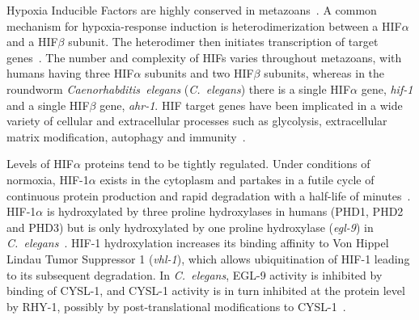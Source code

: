 \documentclass[9pt,twocolumn,twoside]{pnas-new}
\newcommand{\cel}{\emph{C.~elegans}}
\newcommand{\egl}{\emph{egl-9}}
\newcommand{\rhy}{\emph{rhy-1}}
\newcommand{\vhl}{\emph{vhl-1}}
\newcommand{\hif}{\emph{hif-1}}
\newcommand{\eglp}{EGL-9}
\newcommand{\rhyp}{RHY-1}
\newcommand{\vhlp}{VHL-1}
\newcommand{\hifp}{HIF-1}
\begin{document}
Hypoxia Inducible Factors are highly conserved in metazoans~\cite{}. A common mechanism for hypoxia-response induction is heterodimerization between a HIF$\alpha$ and a HIF$\beta$ subunit. The heterodimer then initiates transcription of target genes~\cite{}. The number and complexity of HIFs varies throughout metazoans, with humans having three HIF$\alpha$ subunits and two HIF$\beta$ subunits, whereas in the roundworm \emph{Caenorhabditis~elegans} (\cel{}) there is a single HIF$\alpha$ gene, \hif{} and a single HIF$\beta$ gene, \emph{ahr-1}. HIF target genes have been implicated in a wide variety of cellular and extracellular processes such as glycolysis, extracellular matrix modification, autophagy and immunity~\cite{}.

Levels of HIF$\alpha$ proteins tend to be tightly regulated. Under conditions of normoxia, HIF-1$\alpha$ exists in the cytoplasm and partakes in a futile cycle of continuous protein production and rapid degradation with a half-life of minutes~\cite{}. HIF-1$\alpha$ is hydroxylated by three proline hydroxylases in humans (PHD1, PHD2 and PHD3) but is only hydroxylated by one proline hydroxylase (\egl{}) in \cel{}~\cite{}. HIF-1 hydroxylation increases its binding affinity to Von Hippel Lindau Tumor Suppressor 1 (\vhl{}), which allows ubiquitination of HIF-1 leading to its subsequent degradation. In \cel{}, \eglp{} activity is inhibited by binding of CYSL-1, and CYSL-1 activity is in turn inhibited at the protein level by \rhyp{}, possibly by post-translational modifications to CYSL-1~\cite{Ma2012}.
\end{document}
